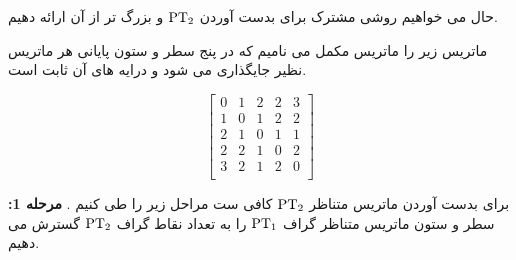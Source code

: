 \documentclass[Persian]{cacna2023-fa}
\begin{document}
				حال می خواهیم روشی مشترک برای بدست آوردن ${\rm PT_{2}}$ و بزرگ تر از آن 
				ارائه دهیم.
				\begin{definition}\label{def1}
					ماتریس زیر را ماتریس مکمل می نامیم که در پنج سطر و ستون پایانی 
				هر ماتریس نظیر جایگذاری می شود و درایه های آن ثابت است.
				\end{definition}
								\begin{equation*}
					\begin{bmatrix}
						0 & 1 & 2 & 2 & 3  \\
						1 & 0 & 1 & 2 & 2 \\
						2 & 1 & 0 & 1 & 1  \\
						2 & 2 & 1 & 0 & 2  \\
						3 & 2 & 1 & 2 & 0  \\
					
					\end{bmatrix}
				\end{equation*}
				\newline

				
				
				برای بدست آوردن ماتریس متناظر ${\rm PT_{2}}$ کافی ست مراحل زیر را طی کنیم .
				\newline
				\textbf{مرحله 1: }
				سطر و ستون ماتریس متناظر گراف ${\rm PT_{1}}$ را به تعداد 
				نقاط گراف ${\rm PT_{2}}$ گسترش می دهیم.
\end{document}
